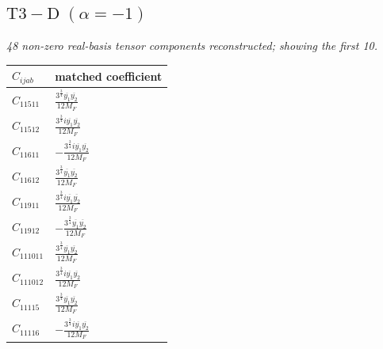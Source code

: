 \documentclass[9pt]{article}
\begin{document}
\subsection*{$ \mathrm{T3-D}\;(\alpha=-1) $}
\textit{48 non-zero real-basis tensor components reconstructed; showing the first 10.}
\begin{longtable}{@{}ll@{}}
\toprule
$C_{ijab}$ & matched coefficient \\
\midrule
$C_{11511}$ & $ \frac{3^{\frac{3}{4}} \overline{y_{1}} \overline{y_{2}}}{12 M_F} $ \\
$C_{11512}$ & $ \frac{3^{\frac{3}{4}} i \overline{y_{1}} \overline{y_{2}}}{12 M_F} $ \\
$C_{11611}$ & $ - \frac{3^{\frac{3}{4}} i \overline{y_{1}} \overline{y_{2}}}{12 M_F} $ \\
$C_{11612}$ & $ \frac{3^{\frac{3}{4}} \overline{y_{1}} \overline{y_{2}}}{12 M_F} $ \\
$C_{11911}$ & $ \frac{3^{\frac{3}{4}} i \overline{y_{1}} \overline{y_{2}}}{12 M_F} $ \\
$C_{11912}$ & $ - \frac{3^{\frac{3}{4}} \overline{y_{1}} \overline{y_{2}}}{12 M_F} $ \\
$C_{111011}$ & $ \frac{3^{\frac{3}{4}} \overline{y_{1}} \overline{y_{2}}}{12 M_F} $ \\
$C_{111012}$ & $ \frac{3^{\frac{3}{4}} i \overline{y_{1}} \overline{y_{2}}}{12 M_F} $ \\
$C_{11115}$ & $ \frac{3^{\frac{3}{4}} \overline{y_{1}} \overline{y_{2}}}{12 M_F} $ \\
$C_{11116}$ & $ - \frac{3^{\frac{3}{4}} i \overline{y_{1}} \overline{y_{2}}}{12 M_F} $ \\
\bottomrule
\end{longtable}
\end{document}
